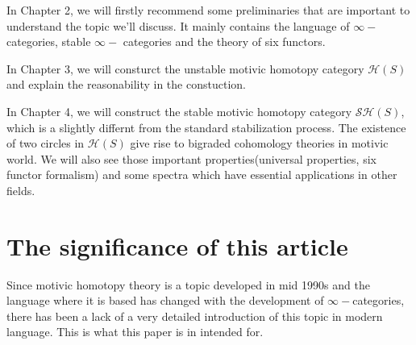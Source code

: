 In Chapter 2, we will firstly recommend some preliminaries that are important to understand the topic we'll discuss. It mainly contains the language of $\infty-$categories, stable $\infty-$ categories and the theory of six functors.

In Chapter 3, we will consturct the unstable motivic homotopy category $\mathcal{H}(S)$ and explain the reasonability in the constuction. 

In Chapter 4, we will construct the stable motivic homotopy category $\mathcal{SH}(S)$, which is a slightly differnt from the standard stabilization process. The existence of two circles in $\mathcal{H}(S)$ give rise to bigraded cohomology theories in motivic world. We will also see those important properties(universal properties, six functor formalism) and some spectra which have essential applications in other fields.

\section{The significance of this article}
Since motivic homotopy theory is a topic developed in mid 1990s and the language where it is based has changed with the development of $\infty-$categories, there has been a lack of a very detailed introduction of this topic in modern language. This is what this paper is in intended for.

